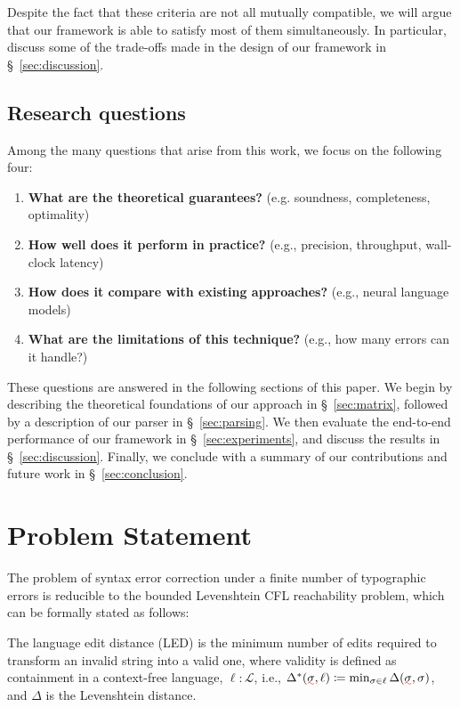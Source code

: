 \documentclass[sigplan,review,anonymous,acmsmall]{acmart}\settopmatter{printfolios=false,printccs=false,printacmref=false}
\begin{document}
Despite the fact that these criteria are not all mutually compatible, we will argue that our framework is able to satisfy most of them simultaneously. In particular, discuss some of the trade-offs made in the design of our framework in \S~\ref{sec:discussion}.

\subsection{Research questions}

Among the many questions that arise from this work, we focus on the following four:

\begin{enumerate}
  \item \textbf{What are the theoretical guarantees?} (e.g. soundness, completeness, optimality)
  \item \textbf{How well does it perform in practice?} (e.g., precision, throughput, wall-clock latency)
  \item \textbf{How does it compare with existing approaches?} (e.g., neural language models)
  \item \textbf{What are the limitations of this technique?} (e.g., how many errors can it handle?)
\end{enumerate}

These questions are answered in the following sections of this paper. We begin by describing the theoretical foundations of our approach in \S~\ref{sec:matrix}, followed by a description of our parser in \S~\ref{sec:parsing}. We then evaluate the end-to-end performance of our framework in \S~\ref{sec:experiments}, and discuss the results in \S~\ref{sec:discussion}. Finally, we conclude with a summary of our contributions and future work in \S~\ref{sec:conclusion}.

\section{Problem Statement}\label{sec:problem}

The problem of syntax error correction under a finite number of typographic errors is reducible to the bounded Levenshtein CFL reachability problem, which can be formally stated as follows:

\begin{definition}
  The language edit distance (LED) is the minimum number of edits required to transform an invalid string into a valid one, where validity is defined as containment in a context-free language, $\ell: \mathcal{L}$, i.e., $\Delta^*(\err{\sigma}, \ell) \coloneqq \min_{\sigma \in \ell}\Delta(\err{\sigma}, \sigma)$, and $\Delta$ is the Levenshtein distance.
\end{definition}
\end{document}
